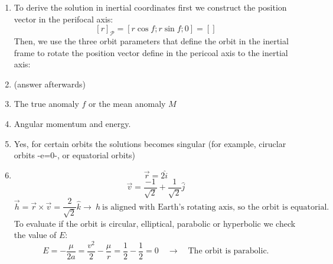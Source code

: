 \documentclass[a4paper]{article}
\begin{document}
\begin{enumerate}[label=\emph{\alph*)}]
  \item To derive the solution in inertial coordinates first we construct the position vector in the perifocal axis:
    \[[r]_{\mathscr{P}}=[r\cos{f};r\sin{f};0] = []\]
  Then, we use the three orbit parameters that define the orbit in the inertial frame to rotate the position vector define in the pericoal axis to the inertial axis:
  
  \item (answer afterwards)
    
  \item The true anomaly $f$  or the mean anomaly $M$
    
  \item Angular momentum and energy.
    
  \item Yes, for certain orbits the solutions becomes singular (for example, ciruclar orbits -e=0-, or equatorial orbits)
   
  \item
    \[\vec{r} = 2 \hat{i}\]
    \[\vec{v} = \frac{-1}{\sqrt{2}}+\frac{1}{\sqrt{2}}\hat{j}\]
    \[\vec{h} = \vec{r} \times \vec{v}= \frac{2}{\sqrt{2}}\hat{k} \rightarrow ~ h ~ \textrm{is aligned with Earth's rotating axis, so the orbit is equatorial.}\]
    To evaluate if the orbit is circular, elliptical, parabolic or hyperbolic we check the value of $E$:
    \[E = -\frac{\mu}{2a} = \frac{v^2}{2}-\frac{\mu}{r} = \frac{1}{2} - \frac{1}{2} = 0 \quad \rightarrow \quad \textrm{The orbit is parabolic.}\]

\end{enumerate}
\end{document}
